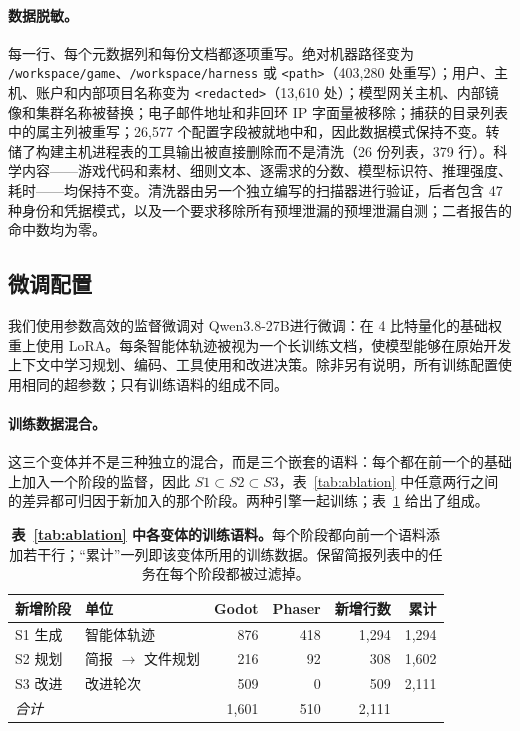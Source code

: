 \paragraph{数据脱敏。}每一行、每个元数据列和每份文档都逐项重写。绝对机器路径变为 \texttt{/workspace/\allowbreak game}、\hspace{0pt}\texttt{/workspace/\allowbreak harness} 或 \texttt{<path>}（403,280 处重写）；用户、主机、账户和内部项目名称变为 \texttt{<redacted>}（13,610 处）；模型网关主机、内部镜像和集群名称被替换；电子邮件地址和非回环 IP 字面量被移除；捕获的目录列表中的属主列被重写；26,577 个配置字段被就地中和，因此数据模式保持不变。转储了构建主机进程表的工具输出被直接删除而不是清洗（26 份列表，379 行）。科学内容——游戏代码和素材、细则文本、逐需求的分数、模型标识符、推理强度、耗时——均保持不变。清洗器由另一个独立编写的扫描器进行验证，后者包含 47 种身份和凭据模式，以及一个要求移除所有预埋泄漏的预埋泄漏自测；二者报告的命中数均为零。

\subsection{微调配置}\label{app:ft}
我们使用参数高效的监督微调对 Qwen3.8-27B\citep{qwen2026}进行微调：在 4 比特量化的基础权重\citep{dettmers2023}上使用 LoRA\citep{hu2022lora}。每条智能体轨迹被视为一个长训练文档，使模型能够在原始开发上下文中学习规划、编码、工具使用和改进决策。除非另有说明，所有训练配置使用相同的超参数；只有训练语料的组成不同。

\paragraph{训练数据混合。}这三个变体并不是三种独立的混合，而是三个嵌套的语料：每个都在前一个的基础上加入一个阶段的监督，因此 $S1 \subset S2 \subset S3$，表~\ref{tab:ablation} 中任意两行之间的差异都可归因于新加入的那个阶段。两种引擎一起训练；表~\ref{tab:mixture} 给出了组成。

\begin{table}[htbp]
\caption{\textbf{表~\ref{tab:ablation} 中各变体的训练语料。}每个阶段都向前一个语料添加若干行；“累计”一列即该变体所用的训练数据。保留简报列表中的任务在每个阶段都被过滤掉。}
\label{tab:mixture}
\centering\small
\begin{tabular}{@{}llrrrr@{}}
\toprule
新增阶段 & 单位 & Godot & Phaser & 新增行数 & 累计 \\
\midrule
S1 生成 & 智能体轨迹 & 876 & 418 & 1,294 & 1,294 \\
S2 规划 & 简报 $\rightarrow$ 文件规划 & 216 & 92 & 308 & 1,602 \\
S3 改进 & 改进轮次 & 509 & 0 & 509 & 2,111 \\
\midrule
\textit{合计} & & 1,601 & 510 & 2,111 & \\
\bottomrule
\end{tabular}
\end{table}

